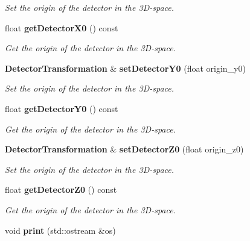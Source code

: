 \begin{DoxyCompactItemize}
\begin{DoxyCompactList}\small\item\em Set the origin of the detector in the 3D-\/space. \item\end{DoxyCompactList}\item 
float {\bf getDetectorX0} () const \label{classCALICE_1_1DetectorTransformation_ad3b792347abe29df128864f8d93db90b}

\begin{DoxyCompactList}\small\item\em Get the origin of the detector in the 3D-\/space. \item\end{DoxyCompactList}\item 
{\bf DetectorTransformation} \& {\bf setDetectorY0} (float origin\_\-y0)\label{classCALICE_1_1DetectorTransformation_a8aa19f83e78ce547f6144b0ca055f5b4}

\begin{DoxyCompactList}\small\item\em Set the origin of the detector in the 3D-\/space. \item\end{DoxyCompactList}\item 
float {\bf getDetectorY0} () const \label{classCALICE_1_1DetectorTransformation_a8b40f70eab9c5f3f7246d881757fc8e9}

\begin{DoxyCompactList}\small\item\em Get the origin of the detector in the 3D-\/space. \item\end{DoxyCompactList}\item 
{\bf DetectorTransformation} \& {\bf setDetectorZ0} (float origin\_\-z0)\label{classCALICE_1_1DetectorTransformation_a74831156933ee18369f6ea48d90e8f29}

\begin{DoxyCompactList}\small\item\em Set the origin of the detector in the 3D-\/space. \item\end{DoxyCompactList}\item 
float {\bf getDetectorZ0} () const \label{classCALICE_1_1DetectorTransformation_aed697370c5d136d4424867598c79421d}

\begin{DoxyCompactList}\small\item\em Get the origin of the detector in the 3D-\/space. \item\end{DoxyCompactList}\item 
void {\bf print} (std::ostream \&os)\label{classCALICE_1_1DetectorTransformation_a53146e49344a9995016d521d423959fc}


\end{DoxyCompactItemize}
